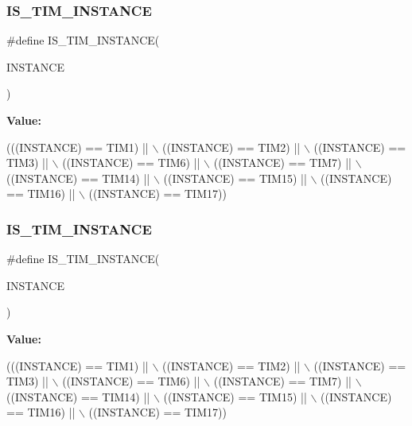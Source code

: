 \subsubsection{\texorpdfstring{I\+S\+\_\+\+T\+I\+M\+\_\+\+I\+N\+S\+T\+A\+N\+CE}{IS\_TIM\_INSTANCE}\hspace{0.1cm}{\footnotesize\ttfamily [15/16]}}
{\footnotesize\ttfamily \#define I\+S\+\_\+\+T\+I\+M\+\_\+\+I\+N\+S\+T\+A\+N\+CE(\begin{DoxyParamCaption}\item[{}]{I\+N\+S\+T\+A\+N\+CE }\end{DoxyParamCaption})}

{\bfseries Value\+:}
\begin{DoxyCode}
(((INSTANCE) == TIM1)    || \(\backslash\)
   ((INSTANCE) == TIM2)    || \(\backslash\)
   ((INSTANCE) == TIM3)    || \(\backslash\)
   ((INSTANCE) == TIM6)    || \(\backslash\)
   ((INSTANCE) == TIM7)    || \(\backslash\)
   ((INSTANCE) == TIM14)   || \(\backslash\)
   ((INSTANCE) == TIM15)   || \(\backslash\)
   ((INSTANCE) == TIM16)   || \(\backslash\)
   ((INSTANCE) == TIM17))
\end{DoxyCode}
\mbox{\label{group___exported__macro_gaba506eb03409b21388d7c5a6401a4f98}} 
\subsubsection{\texorpdfstring{I\+S\+\_\+\+T\+I\+M\+\_\+\+I\+N\+S\+T\+A\+N\+CE}{IS\_TIM\_INSTANCE}\hspace{0.1cm}{\footnotesize\ttfamily [16/16]}}
{\footnotesize\ttfamily \#define I\+S\+\_\+\+T\+I\+M\+\_\+\+I\+N\+S\+T\+A\+N\+CE(\begin{DoxyParamCaption}\item[{}]{I\+N\+S\+T\+A\+N\+CE }\end{DoxyParamCaption})}

{\bfseries Value\+:}
\begin{DoxyCode}
(((INSTANCE) == TIM1)    || \(\backslash\)
   ((INSTANCE) == TIM2)    || \(\backslash\)
   ((INSTANCE) == TIM3)    || \(\backslash\)
   ((INSTANCE) == TIM6)    || \(\backslash\)
   ((INSTANCE) == TIM7)    || \(\backslash\)
   ((INSTANCE) == TIM14)   || \(\backslash\)
   ((INSTANCE) == TIM15)   || \(\backslash\)
   ((INSTANCE) == TIM16)   || \(\backslash\)
   ((INSTANCE) == TIM17))
\end{DoxyCode}
\mbox{\label{group___exported__macro_ga98104b1522d066b0c20205ca179d0eba}} 
